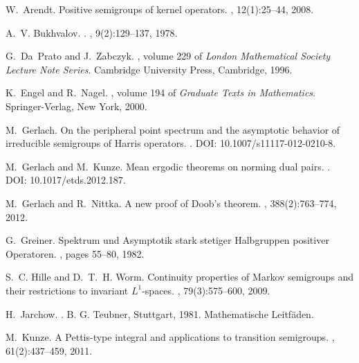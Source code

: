 \documentclass{amsart}
\numberwithin{equation}{section}
\theoremstyle{remark}
\theoremstyle{definition}
\begin{document}
\begin{thebibliography}{10}

W.~Arendt.
\newblock Positive semigroups of kernel operators.
, 12(1):25--44, 2008.

A.~V. Bukhvalov.
.
, 9(2):129--137, 1978.

G.~Da~Prato and J.~Zabczyk.
, volume 229 of {\em
  London Mathematical Society Lecture Note Series}.
\newblock Cambridge University Press, Cambridge, 1996.

K.~Engel and R.~Nagel.
, volume
  194 of {\em Graduate Texts in Mathematics}.
\newblock Springer-Verlag, New York, 2000.

M.~Gerlach.
\newblock On the peripheral point spectrum and the asymptotic behavior of
  irreducible semigroups of {H}arris operators.
.
\newblock DOI: 10.1007/s11117-012-0210-8.

M.~Gerlach and M.~Kunze.
\newblock Mean ergodic theorems on norming dual pairs.
.
\newblock DOI: 10.1017/etds.2012.187.

M.~Gerlach and R.~Nittka.
\newblock A new proof of {D}oob's theorem.
, 388(2):763--774, 2012.

G.~Greiner.
\newblock Spektrum und {A}symptotik stark stetiger {H}albgruppen positiver
  {O}peratoren.
, pages
  55--80, 1982.

S.~C. Hille and D.~T.~H. Worm.
\newblock Continuity properties of {M}arkov semigroups and their restrictions
  to invariant {$L^1$}-spaces.
, 79(3):575--600, 2009.

H.~Jarchow.
.
\newblock B. G. Teubner, Stuttgart, 1981.
\newblock Mathematische Leitf{\"a}den.

M.~Kunze.
\newblock A {P}ettis-type integral and applications to transition semigroups.
, 61(2):437--459, 2011.


\end{thebibliography}
\end{document}
